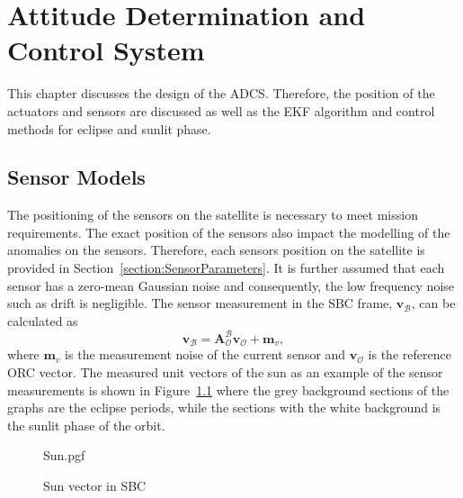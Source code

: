 \chapter{Attitude Determination and Control System}
\label{chap:ADCS}
This chapter discusses the design of the ADCS. Therefore, the position of the actuators and sensors are discussed as well as the EKF algorithm and control methods for eclipse and sunlit phase. 

\section{Sensor Models}
\label{section:SensorModel}
The positioning of the sensors on the satellite is necessary to meet mission requirements. The exact position of the sensors also impact the modelling of the anomalies on the sensors. Therefore, each sensors position on the satellite is provided in Section~\ref{section:SensorParameters}. It is further assumed that each sensor has a zero-mean Gaussian noise and consequently, the low frequency noise such as drift is negligible. The sensor measurement in the SBC frame, $\mathbf{v}_{\mathcal{B}}$,  can be calculated as
\begin{equation}
\mathbf{v}_{\mathcal{B}} = \boldsymbol{A}^{\mathcal{B}}_{\mathcal{O}} \mathbf{v}_\mathcal{O} + \mathbf{m}_v,
\end{equation}
where $\mathbf{m}_v$ is the measurement noise of the current sensor and $\mathbf{v}_{\mathcal{O}}$ is the reference ORC vector. The measured unit vectors of the sun as an example of the sensor measurements is shown in Figure~\ref{fig:SunSensorPlot} where the grey background sections of the graphs are the eclipse periods, while the sections with the white background is the sunlit phase of the orbit.

\begin{figure}[!htb]
	\centering
	\def\pgfwidth{7cm}
	{Sun.pgf}
	
	\caption{Sun vector in SBC}
	\label{fig:SunSensorPlot}
\end{figure}

%	
%
%	


